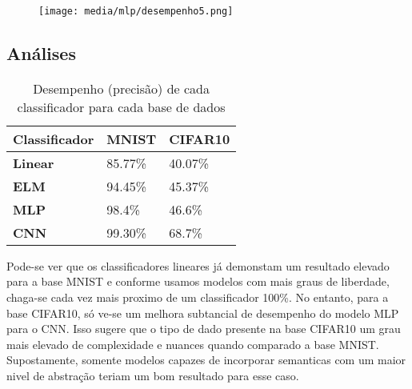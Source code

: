 \documentclass[a4paper]{article}
\begin{document}
\begin{figure}[H]
    \centering   %
    \centerline{\texttt{[image: media/mlp/desempenho5.png]}}
    \label{fig:fig2}  %
\end{figure}


\subsection{Análises}

\begin{table}[H]
    \centering
    \begin{tabular}{|l|l|l|}
        \hline
        \textbf{Classificador} & \textbf{ MNIST} & \textbf{CIFAR10} \\ \hline
        \textbf{Linear}        & 85.77\%         & 40.07\%          \\ \hline
        \textbf{ELM}           & 94.45\%         & 45.37\%          \\ \hline
        \textbf{MLP}           & 98.4\%          & 46.6\%           \\ \hline
        \textbf{CNN}           & 99.30\%         & 68.7\%           \\ \hline
    \end{tabular}
    \caption{Desempenho (precisão) de cada classificador para cada base de dados}  
\end{table}

Pode-se ver que os classificadores lineares já demonstam um resultado elevado para a base MNIST e conforme usamos modelos com mais graus de liberdade, chaga-se cada vez mais proximo de um classificador 100\%. No entanto, para a base CIFAR10, só ve-se um melhora subtancial de desempenho do modelo MLP para o CNN. Isso sugere que o tipo de dado presente na base CIFAR10 um grau mais elevado de complexidade e nuances quando comparado a base MNIST. Supostamente, somente modelos capazes de incorporar semanticas com um maior nivel de abstração teriam um bom resultado para esse caso.
\end{document}
